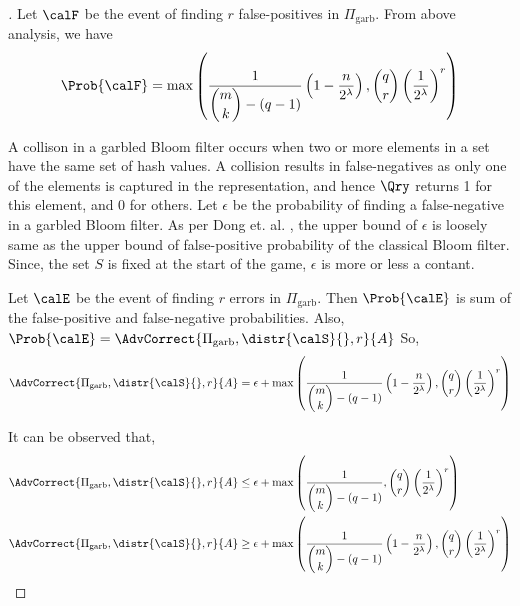 \begin{proof}[]
Let $\calF$ be the event of finding $r$ false-positives in $\Pi_{\mathrm{garb}}$. From above analysis, we have
\begin{align*}
\Prob{\calF} =  \max\left(\dfrac{1}{\dbinom{m}{k}-(q-1)}\left(1-\dfrac{n}{2^\lambda}\right), \dbinom{q}{r}\left(\dfrac{1}{2^\lambda}\right)^r \right)
\end{align*}

A collison in a garbled Bloom filter occurs when two or more elements in a set have the same set of hash values. A collision results in false-negatives as only one of the elements is captured in the representation, and hence $\Qry$ returns 1 for this element, and 0 for others. Let $\epsilon$ be the probability of finding a false-negative in a garbled Bloom filter. As per Dong et. al. \cite{dong2013private}, the upper bound of $\epsilon$  is loosely same as the upper bound of false-positive probability of the classical Bloom filter. Since, the set $S$ is fixed at the start of the game, $\epsilon$ is more or less a contant.

Let $\calE$ be the event of finding $r$ errors in $\Pi_{\mathrm{garb}}$. Then $\Prob{\calE}$ is sum of the false-positive and false-negative probabilities. Also, $\Prob{\calE} = \AdvCorrect{\Pi_{\mathrm{garb}},\distr{\calS}{},r}{A}$ So, 
\begin{align*}
\AdvCorrect{\Pi_{\mathrm{garb}},\distr{\calS}{},r}{A} = \epsilon +  \max\left(\dfrac{1}{\dbinom{m}{k}-(q-1)}\left(1-\dfrac{n}{2^\lambda}\right), \dbinom{q}{r}\left(\dfrac{1}{2^\lambda}\right)^r \right)
\end{align*}

It can be observed that,
\begin{align*}
\AdvCorrect{\Pi_{\mathrm{garb}},\distr{\calS}{},r}{A} & \leq \epsilon + \max\left(\dfrac{1}{\dbinom{m}{k}-(q-1)}, \dbinom{q}{r}\left(\dfrac{1}{2^\lambda}\right)^r \right)\\
\AdvCorrect{\Pi_{\mathrm{garb}},\distr{\calS}{},r}{A} & \geq \epsilon + \max\left(\dfrac{1}{\dbinom{m}{k}-(q-1)}\left(1-\dfrac{n}{2^\lambda}\right), \dbinom{q}{r}\left(\frac{1}{2^\lambda}\right)^r \right)
\end{align*}
\end{proof}